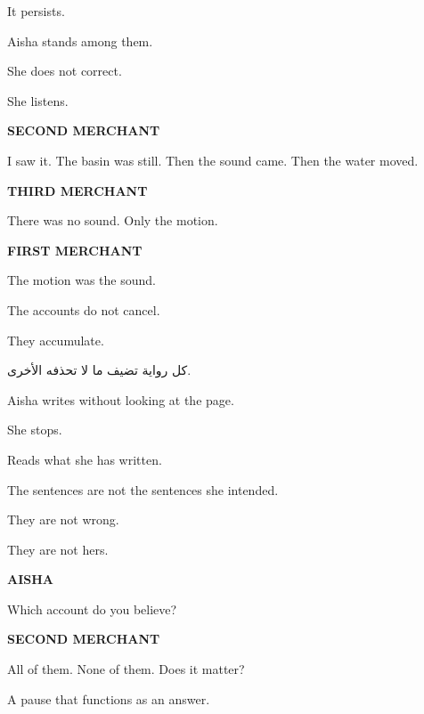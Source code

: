 It persists.

\medskip

Aisha stands among them.

She does not correct.

She listens.

\medskip

\textbf{SECOND MERCHANT}

I saw it. The basin was still. Then the sound came. Then the water moved.

\medskip

\textbf{THIRD MERCHANT}

There was no sound. Only the motion.

\medskip

\textbf{FIRST MERCHANT}

The motion was the sound.

\medskip

The accounts do not cancel.

They accumulate.

\medskip

\begin{AR}
كل رواية تضيف ما لا تحذفه الأخرى.
\end{AR}

\medskip

Aisha writes without looking at the page.

\medskip


\medskip

She stops.

Reads what she has written.

\medskip

The sentences are not the sentences she intended.

They are not wrong.

They are not hers.

\medskip

\textbf{AISHA}

Which account do you believe?

\medskip

\textbf{SECOND MERCHANT}

All of them. None of them. Does it matter?

\medskip

A pause that functions as an answer.

